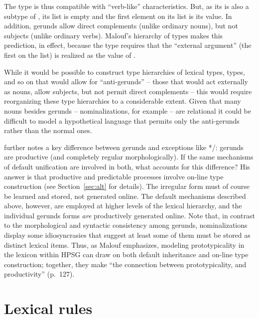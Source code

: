 \documentclass[output=paper,biblatex,babelshorthands,newtxmath,draftmode,colorlinks,citecolor=brown]{langscibook}
\begin{document}
The type  is thus compatible with ``verb-like'' characteristics.
But, as its  is also a subtype of , its  list is empty and the first element on its  list is its  value. In addition, gerunds allow direct complements (unlike ordinary nouns), but not subjects (unlike ordinary verbs).
Malouf's hierarchy of types makes this prediction, in effect, because the  type requires that the ``external argument'' (the first on the  list) is realized as the value of .

\largerpage
While it would be possible to construct type hierarchies of lexical types,  types, and so on that would allow for ``anti-gerunds'' -- those that would act externally as nouns, allow subjects, but not permit direct complements -- this would require reorganizing these type hierarchies to a considerable extent.
Given that many nouns besides gerunds -- nominalizations, for example -- are relational it could be difficult to model a hypothetical language that permits only the anti-gerunds rather than the normal ones.

\citeauthor{Malouf2000a} further notes a key difference between gerunds and exceptions like */:  gerunds are productive (and completely regular morphologically).
If the same mechanisms of default unification are involved in both, what accounts for this difference?
His answer is that productive and predictable processes involve on-line type construction (see Section~\ref{sec:alt} for details).
The irregular form  must of course be learned and stored, not generated online.
The default mechanisms described above, however, are employed at higher levels of the lexical hierarchy, and the individual gerunds forms \emph{are} productively generated online.
Note that, in contrast to the morphological and syntactic consistency among gerunds,  nominalizations display some idiosyncrasies that suggest at least some of them must be stored as distinct lexical items.
Thus, as Malouf emphasizes, modeling prototypicality in the lexicon within HPSG can draw on both default inheritance and on-line type construction; together, they make ``the connection between prototypicality, and productivity'' (p.\ 127).

\section{Lexical rules}
\label{lexicon-sec-lexical-rules}
\end{document}
